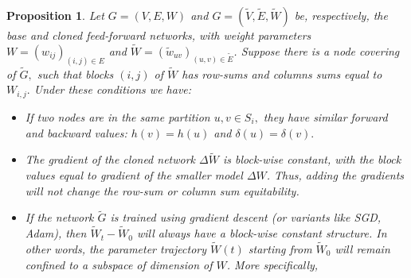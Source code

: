 \documentclass{article}
\newtheorem{proposition}{Proposition}[section]
\begin{document}
\begin{proposition}
\label{prop:cloned}
    Let $G=(V,E,W)$ and $G=(\widetilde V,\widetilde E,\widetilde W)$
be, respectively, the \emph{base} and \emph{cloned} feed‑forward networks, with
weight parameters \(W=(w_{ij})_{(i,j)\in E}\) and
\(\widetilde{W}=(\widetilde w_{uv})_{(u,v)\in \widetilde E}\). Suppose there is a node covering of $\widetilde{G},$ such that blocks $(i,j)$ of $\widetilde{W}$ has row-sums and columns sums equal to $W_{i,j}.$ Under these conditions we have:
\begin{itemize}
    \item If two nodes are in the same partition $u,v \in S_i,$ they have similar forward and backward values: $h(v) = h(u)$ and $\delta(u)=\delta(v).$
    \item The gradient of the cloned network $\Delta\widetilde{W}$ is block-wise constant, with the block values equal to gradient of the smaller model $\Delta W$. Thus, adding the gradients will not change the row-sum or column sum equitability.
    \item If the network $\widetilde{G}$ is trained using gradient descent (or variants like SGD, Adam), then $\widetilde{W}_t - \widetilde{W}_0$ will always have a block-wise constant structure. In other words, the parameter trajectory $\widetilde{W}(t)$ starting from $\widetilde{W}_0$ will remain confined to a subspace of dimension of $W$. More specifically,
\end{itemize}
\end{proposition}
\end{document}
